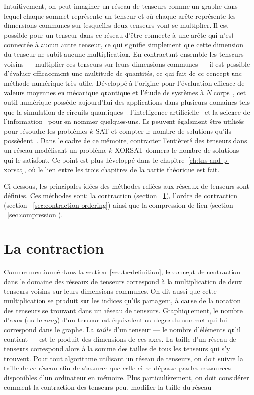 Intuitivement, on peut imaginer un réseau de tenseurs comme un graphe dans lequel chaque sommet représente un tenseur et où chaque arête représente les dimensions communes sur lesquelles deux tenseurs vont se multiplier.
Il est possible pour un tenseur dans ce réseau d'être connecté à une arête qui n'est connectée à aucun autre tenseur, ce qui signifie simplement que cette dimension du tenseur ne subit aucune multiplication.
En contractant ensemble les tenseurs voisins --- multiplier ces tenseurs sur leurs dimensions communes --- il est possible d'évaluer efficacement une multitude de quantités, ce qui fait de ce concept une méthode numérique très utile.
Développé à l'origine pour l'évaluation efficace de valeurs moyennes en mécanique quantique et l'étude de systèmes à $N$ corps~\cite{white1992density, schollwock2011density}, cet outil numérique possède aujourd'hui des applications dans plusieurs domaines tels que la simulation de circuits quantiques~\cite{huang_classical_2020, seitz_simulating_2023}, l'intelligence artificielle~\cite{pmlr-v130-miller21a, wang_tensor_2023} et la science de l'information~\cite{cichocki2016tensor} pour en nommer quelques-uns.
Ils peuvent également être utilisés pour résoudre les problèmes $k$-SAT et compter le nombre de solutions qu'ils possèdent~\cite{garcia-saez_exact_2011, liu2021tropical}.
Dans le cadre de ce mémoire, contracter l'entièreté des tenseurs dans un réseau modélisant un problème $k$-XORSAT donnera le nombre de solutions qui le satisfont.
Ce point est plus développé dans le chapitre~\ref{ch:tns-and-p-xorsat}, où le lien entre les trois chapitres de la partie théorique est fait.

Ci-dessous, les principales idées des méthodes reliées aux réseaux de tenseurs sont définies.
Ces méthodes sont: la contraction (section ~\ref{sec:contraction}), l'ordre de contraction (section ~\ref{sec:contraction-ordering}) ainsi que la compression de lien (section ~\ref{sec:compression}).


\section{La contraction} \label{sec:contraction}
Comme mentionné dans la section~\ref{sec:tn-definition}, le concept de contraction dans le domaine des réseaux de tenseurs correspond à la multiplication de deux tenseurs voisins sur leurs dimensions communes.
On dit aussi que cette multiplication se produit sur les indices qu'ils partagent, à cause de la notation des tenseurs se trouvant dans un réseau de tenseurs.
Graphiquement, le nombre d'axes (ou le \emph{rang}) d'un tenseur est équivalent au degré du sommet qui lui correspond dans le graphe.
La \emph{taille} d'un tenseur --- le nombre d'éléments qu'il contient --- est le produit des dimensions de ces axes.
La taille d'un réseau de tenseurs correspond alors à la somme des tailles de tous les tenseurs qui s'y trouvent.
Pour tout algorithme utilisant un réseau de tenseurs, on doit suivre la taille de ce réseau afin de s'assurer que celle-ci ne dépasse pas les ressources disponibles d'un ordinateur en mémoire.
Plus particulièrement, on doit considérer comment la contraction des tenseurs peut modifier la taille du réseau.

